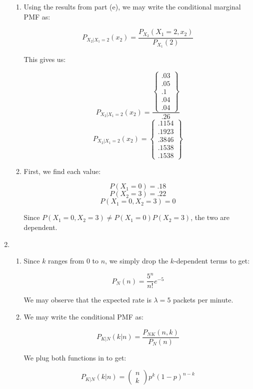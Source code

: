 \begin{enumerate}
\begin{enumerate}
      \item Using the results from part (e), we may write the conditional marginal PMF as:

        $$P_{X_2|X_1=2}(x_2)=\frac{P_{X_2}(X_1=2,x_2)}{P_{X_1}(2)}$$

        This gives us:

        $$P_{X_2|X_1=2}(x_2)=\frac{\left\{ \begin{matrix}.03\\.05\\.1\\.04\\.04 \end{matrix}\right\}}{.26}$$
        $$\boxed{P_{X_2|X_1=2}(x_2)=\left\{ \begin{matrix}.1154\\.1923\\.3846\\.1538\\.1538 \end{matrix}\right\}}$$

      \item First, we find each value:

        $$P(X_1=0)=.18$$
        $$P(X_2=3)=.22$$
        $$P(X_1=0,X_2=3)=0$$

        Since $\boxed{P(X_1=0,X_2=3)\neq P(X_1=0)P(X_2=3)}$, the two are dependent.

    \end{enumerate}

  \item

    \begin{enumerate}

      \item Since $k$ ranges from $0$ to $n$, we simply drop the $k$-dependent terms to get:

        $$\boxed{P_N(n)=}\frac{5^n}{n!}e^{-5}$$

        We may observe that the expected rate is $\boxed{\lambda=5}$ packets per minute.

      \item We may write the conditional PMF as:

        $$P_{K|N}(k|n)=\frac{P_{NK}(n,k)}{P_N(n)}$$

        We plug both functions in to get:

        $$\boxed{P_{K|N}(k|n)=\left( \begin{matrix} n\\k\end{matrix} \right)p^k(1-p)^{n-k}}$$


\end{enumerate}
\end{enumerate}
